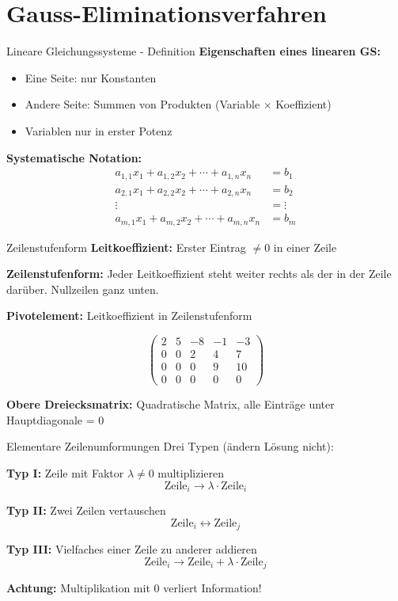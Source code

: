 \documentclass[a4paper, fontsize=7pt]{scrartcl}
\begin{document}
\section{Gauss-Eliminationsverfahren}

\begin{mainbox}{Lineare Gleichungssysteme - Definition}
\textbf{Eigenschaften eines linearen GS:}
\begin{itemize}
    \item Eine Seite: nur Konstanten
    \item Andere Seite: Summen von Produkten (Variable $\times$ Koeffizient)
    \item Variablen nur in erster Potenz
\end{itemize}

\textbf{Systematische Notation:}
\begin{align*}
a_{1,1}x_1 + a_{1,2}x_2 + \cdots + a_{1,n}x_n &= b_1 \\
a_{2,1}x_1 + a_{2,2}x_2 + \cdots + a_{2,n}x_n &= b_2 \\
\vdots \quad &= \vdots \\
a_{m,1}x_1 + a_{m,2}x_2 + \cdots + a_{m,n}x_n &= b_m
\end{align*}
\end{mainbox}

\begin{mainbox}{Zeilenstufenform}
\textbf{Leitkoeffizient:} Erster Eintrag $\neq 0$ in einer Zeile

\textbf{Zeilenstufenform:} Jeder Leitkoeffizient steht weiter rechts als der in der Zeile darüber. Nullzeilen ganz unten.

\textbf{Pivotelement:} Leitkoeffizient in Zeilenstufenform

$$\begin{pmatrix}
\boxed{2} & 5 & -8 & -1 & -3 \\
0 & 0 & \boxed{2} & 4 & 7 \\
0 & 0 & 0 & \boxed{9} & 10 \\
0 & 0 & 0 & 0 & 0
\end{pmatrix}$$

\textbf{Obere Dreiecksmatrix:} Quadratische Matrix, alle Einträge unter Hauptdiagonale = 0
\end{mainbox}

\begin{mainbox}{Elementare Zeilenumformungen}
Drei Typen (ändern Lösung nicht):

\textbf{Typ I:} Zeile mit Faktor $\lambda \neq 0$ multiplizieren
$$\text{Zeile}_i \to \lambda \cdot \text{Zeile}_i$$

\textbf{Typ II:} Zwei Zeilen vertauschen
$$\text{Zeile}_i \leftrightarrow \text{Zeile}_j$$

\textbf{Typ III:} Vielfaches einer Zeile zu anderer addieren
$$\text{Zeile}_i \to \text{Zeile}_i + \lambda \cdot \text{Zeile}_j$$

\textbf{Achtung:} Multiplikation mit 0 verliert Information!
\end{mainbox}
\end{document}
